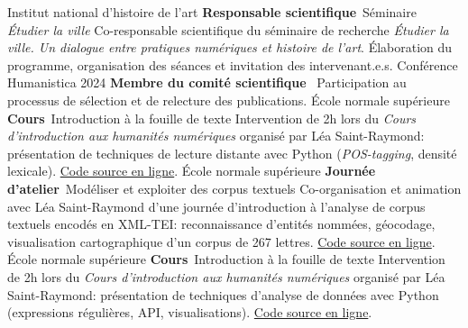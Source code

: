 	{%
		Institut national d'histoire de l'art}
	{%
		\textbf{Responsable scientifique}~Séminaire \textit{Étudier la ville}}
	{%
		Co-responsable scientifique du séminaire de recherche \textit{Étudier la ville. Un dialogue entre pratiques numériques et histoire de l'art}. Élaboration du programme, organisation des séances et invitation des intervenant.e.s.}
	{%
		Conférence Humanistica 2024}
	{%
		\textbf{Membre du comité scientifique}~}
	{%
		Participation au processus de sélection et de relecture des publications.}
	{%
		École normale supérieure}
	{%
		\textbf{Cours}~Introduction à la fouille de texte}
	{%
		Intervention de 2h lors du \textit{Cours d'introduction aux humanités numériques} organisé par Léa Saint-Raymond: présentation de techniques de lecture distante avec Python (\textit{POS-tagging}, densité lexicale). \href{https://github.com/paulhectork/cours_ens2024_fouille_de_texte.git}{Code source en ligne}.}
	{%
		École normale supérieure}
	{%
		\textbf{Journée d'atelier}~Modéliser et exploiter des corpus textuels}
	{%
		Co-organisation et animation avec Léa Saint-Raymond d'une journée d'introduction à l'analyse de corpus textuels encodés en XML-TEI: reconnaissance d'entités nommées, géocodage, visualisation cartographique d'un corpus de 267 lettres. \href{https://github.com/paulhectork/cours_ens2023_xmltei}{Code source en ligne}.}
	{%
		École normale supérieure}
	{%
		\textbf{Cours}~Introduction à la fouille de texte}
	{%
		Intervention de 2h lors du \textit{Cours d'introduction aux humanités numériques} organisé par Léa Saint-Raymond: présentation de techniques d'analyse de données avec Python (expressions régulières, API, visualisations). \href{https://github.com/paulhectork/cours_ens2024_fouille_de_texte.git}{Code source en ligne}.}

